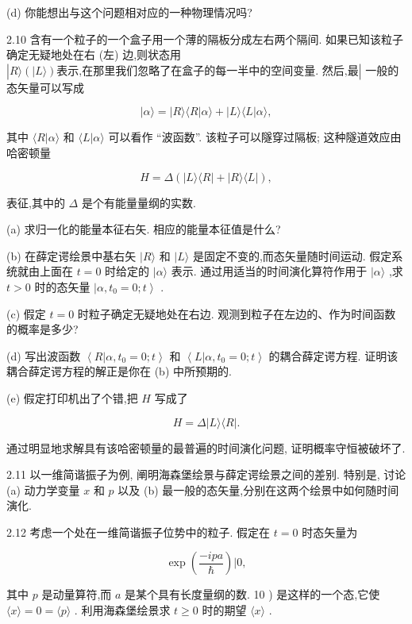 \documentclass[lang=cn,newtx,10pt,scheme=chinese,thmcnt=section]{elegantbook}
\begin{document}
(d) 你能想出与这个问题相对应的一种物理情况吗?

2.10 含有一个粒子的一个盒子用一个薄的隔板分成左右两个隔间. 如果已知该粒子确定无疑地处在右 (左) 边,则状态用 $\left| {R\rangle \left( {|L\rangle }\right) \text{表示,在那里我们忽略了在盒子的每一半中的空间变量. 然后,最}}\right|$ 一般的态矢量可以写成

$$
\left| {\alpha \rangle = }\right| R\rangle \langle R | \alpha \rangle + | L\rangle \langle L | \alpha \rangle ,
$$

其中 $\langle R | \alpha \rangle$ 和 $\langle L | \alpha \rangle$ 可以看作 “波函数”. 该粒子可以隧穿过隔板; 这种隧道效应由哈密顿量

$$
H = \Delta \left( {\left| {L\rangle \langle R}\right| + \left| {R\rangle \langle L}\right| }\right) ,
$$

表征,其中的 $\Delta$ 是个有能量量纲的实数.

(a) 求归一化的能量本征右矢. 相应的能量本征值是什么?

(b) 在薛定谔绘景中基右矢 $|R\rangle$ 和 $|L\rangle$ 是固定不变的,而态矢量随时间运动. 假定系统就由上面在 $t = 0$ 时给定的 $|\alpha \rangle$ 表示. 通过用适当的时间演化算符作用于 $|\alpha \rangle$ ,求 $t > 0$ 时的态矢量 $\left| {\alpha ,{t}_{0} = 0;t}\right\rangle$ .

(c) 假定 $t = 0$ 时粒子确定无疑地处在右边. 观测到粒子在左边的、作为时间函数的概率是多少?

(d) 写出波函数 $\left\langle {R | \alpha ,{t}_{0} = 0;t}\right\rangle$ 和 $\left\langle {L | \alpha ,{t}_{0} = 0;t}\right\rangle$ 的耦合薛定谔方程. 证明该耦合薛定谔方程的解正是你在 (b) 中所预期的.

(e) 假定打印机出了个错,把 $H$ 写成了

$$
H = \Delta \left| {L\rangle \langle R}\right| .
$$

通过明显地求解具有该哈密顿量的最普遍的时间演化问题, 证明概率守恒被破坏了.

2.11 以一维简谐振子为例, 阐明海森堡绘景与薛定谔绘景之间的差别. 特别是, 讨论 (a) 动力学变量 $x$ 和 $p$ 以及 (b) 最一般的态矢量,分别在这两个绘景中如何随时间演化.

2.12 考虑一个处在一维简谐振子位势中的粒子. 假定在 $t = 0$ 时态矢量为

$$
\exp \left( \frac{-{ipa}}{\hbar }\right) | 0,
$$

其中 $p$ 是动量算符,而 $a$ 是某个具有长度量纲的数. 10 ) 是这样的一个态,它使 $\langle x\rangle = 0 = \langle p\rangle$ . 利用海森堡绘景求 $t \geq 0$ 时的期望 $\langle x\rangle$ .
\end{document}
